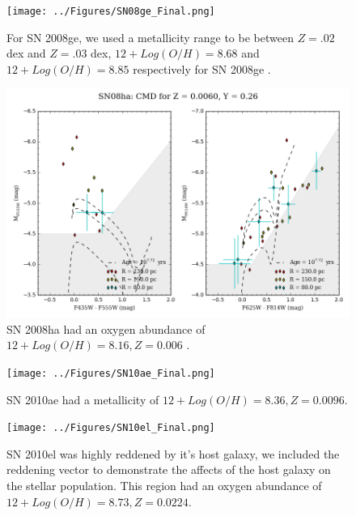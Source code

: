 \documentclass[preprint]{aastex}
\begin{document}
\begin{figure}[p]
	\centering
	\texttt{[image: ../Figures/SN08ge\_Final.png]}
	\caption{For SN 2008ge, we used a metallicity range to be between $Z = .02$ dex and $Z = .03$ dex, 
	$12 + Log(O/H) = 8.68$  and $12 + Log(O/H) = 8.85$ respectively for SN 2008ge  \citep{pro11}. }
    	\label{fig:08geCMD}
\end{figure}
\begin{figure}[p]
	\centering
	\includegraphics[scale=0.5]{../Figures/SN08ha_Final.png}
	\caption{SN 2008ha had an oxygen abundance of $ 12 + Log(O/H) = 8.16, Z = 0.006$ \citep{fol09,tak95}.}
    	\label{fig:08haCMD}
\end{figure}
\begin{figure}[p]
	\centering
	\texttt{[image: ../Figures/SN10ae\_Final.png]}
	\caption{SN 2010ae had a metallicity of $ 12 + Log(O/H) = 8.36, Z = 0.0096$. }
    	\label{fig:10aeCMD}
\end{figure}
\begin{figure}[p]
	\centering
	\texttt{[image: ../Figures/SN10el\_Final.png]}
	\caption{ SN 2010el was highly reddened by it's host galaxy, we included the reddening vector 
	to demonstrate the affects of the host galaxy on the stellar population. 
	This region had an oxygen abundance of $ 12 + Log(O/H) = 8.73, Z = 0.0224.$}
    	\label{fig:10elCMD}
\end{figure}

\end{document}
